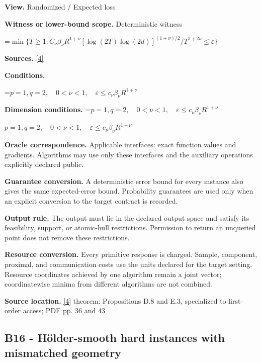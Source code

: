 \documentclass[10pt,a4paper]{article}
\newcommand{\AtlasMath}[1]{\par\begingroup\centering\setbox0=\hbox{$\displaystyle #1$}\ifdim\wd0>1.4\linewidth\typeout{ATLAS WIDE FORMULA: \the\wd0}\fi\ifdim\wd0>\linewidth\resizebox{\linewidth}{!}{\box0}\else\box0\fi\par\endgroup}
\newcommand{\AtlasInlineMath}[1]{\begingroup\setbox0=\hbox{$#1$}\ifdim\wd0>.4\linewidth\endgroup\AtlasMath{#1}\else\endgroup$#1$\fi}
\begin{document}
\textbf{View.} Randomized / Expected loss



\textbf{Witness or lower-bound scope.} Deterministic witness



\AtlasMath{\min\{T\ge1:C_\nu\beta_\nu R^{1+\nu}[\log(2T)\log(2d)]^{(1+\nu)/2}/T^{1+2\nu}\le\varepsilon\}}


\textbf{Sources.} \href{https://arxiv.org/pdf/2609.32910}{[4]}



\textbf{Conditions.}
\AtlasMath{p=1,q=2,\quad0<\nu<1,\quad\varepsilon\le c_\nu\beta_\nu R^{1+\nu}}




\textbf{Dimension conditions.} \AtlasInlineMath{p=1,q=2,\quad0<\nu<1,\quad\varepsilon\le c_\nu\beta_\nu R^{1+\nu}}



\textbf{Oracle correspondence.} Applicable interfaces: exact function values and gradients. Algorithms may use only these interfaces and the auxiliary operations explicitly declared public.



\textbf{Guarantee conversion.} A deterministic error bound for every instance also gives the same expected-error bound. Probability guarantees are used only when an explicit conversion to the target contract is recorded.



\textbf{Output rule.} The output must lie in the declared output space and satisfy its feasibility, support, or atomic-hull restrictions. Permission to return an unqueried point does not remove these restrictions.



\textbf{Resource conversion.} Every primitive response is charged. Sample, component, proximal, and communication costs use the units declared for the target setting. Resource coordinates achieved by one algorithm remain a joint vector; coordinatewise minima from different algorithms are not combined.



\textbf{Source location.} \href{https://arxiv.org/pdf/2609.32910}{[4]} theorem: Propositions D.8 and E.3, specialized to first-order access; PDF pp. 36 and 43



\subsection{B16 - Hölder-smooth hard instances with mismatched geometry}
\end{document}
